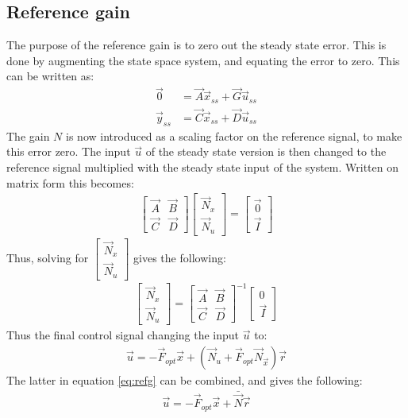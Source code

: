 \subsection{Reference gain}
The purpose of the reference gain is to zero out the steady state error. This is done by augmenting the state space system, and equating the error to zero. This can be written as:
\begin{align}
\vec{0} &= \vec{A}\vec{x}_{ss} + \vec{G}\vec{u}_{ss}\\
\vec{y}_{ss} &= \vec{C}\vec{x}_{ss} + \vec{D}\vec{u}_{ss}
\end{align}
The gain $N$ is now introduced as a scaling factor on the reference signal, to make this error zero. The input $\vec{u}$ of the steady state version is then changed to the reference signal multiplied with the steady state input of the system. Written on matrix form this becomes:
\begin{align}
\begin{bmatrix}
\vec{A} & \vec{B}\\
\vec{C} & \vec{D}
\end{bmatrix}\begin{bmatrix}
\vec{N}_x\\
\vec{N}_u
\end{bmatrix} = \begin{bmatrix}
\vec{0}\\
\vec{I}
\end{bmatrix}
\end{align}
Thus, solving for $\begin{bmatrix} \vec{N}_x\\ \vec{N}_u \end{bmatrix}$ gives the following: 
\begin{align}
\begin{bmatrix}
\vec{N}_x\\
\vec{N}_u
\end{bmatrix} =
\begin{bmatrix}
\vec{A} & \vec{B}\\
\vec{C} & \vec{D}
\end{bmatrix}^{-1}
\begin{bmatrix}
0\\
\vec{I}
\end{bmatrix}
\end{align}
Thus the final control signal changing the input $\vec{u}$ to:
\begin{align}
\vec{u} = -\vec{F}_{opt}\vec{x} + (\vec{N}_u + \vec{F}_{opt}\vec{N}_{\vec{x}})\vec{r}
\label{eq:refg}
\end{align}
The latter in equation \vref{eq:refg} can be combined, and gives the following:
\begin{align}
\vec{u} = -\vec{F}_{opt}\vec{x} + \bar{\vec{N}}\vec{r}
\end{align}


